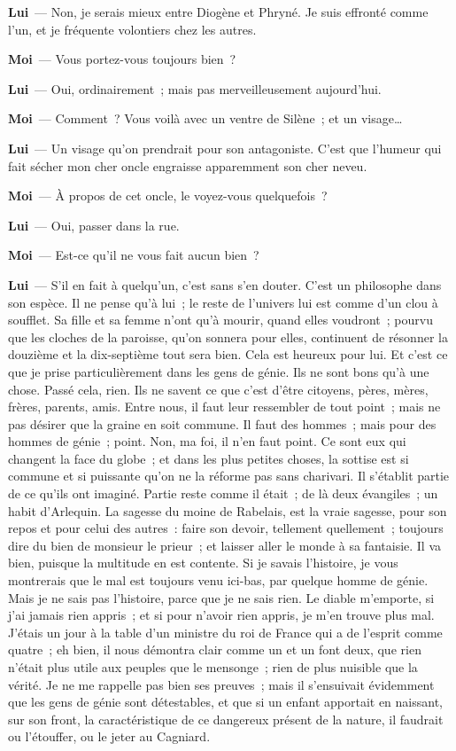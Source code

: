 \documentclass[french,twoside]{book} %
\newcommand{\labelchar}[1]{\textbf{\color{rubric} #1}}
\begin{document}
\labelchar{Lui} — Non, je serais mieux entre Diogène et Phryné. Je suis effronté comme l’un, et je fréquente volontiers chez les autres.\par
\labelchar{Moi} — Vous portez-vous toujours bien ?\par
\labelchar{Lui} — Oui, ordinairement ; mais pas merveilleusement aujourd’hui.\par
\labelchar{Moi} — Comment ? Vous voilà avec un ventre de Silène ; et un visage…\par
\labelchar{Lui} — Un visage qu’on prendrait pour son antagoniste. C’est que l’humeur qui fait sécher mon cher oncle engraisse apparemment son cher neveu.\par
\labelchar{Moi} — À propos de cet oncle, le voyez-vous quelquefois ?\par
\labelchar{Lui} — Oui, passer dans la rue.\par
\labelchar{Moi} — Est-ce qu’il ne vous fait aucun bien ?\par
\labelchar{Lui} — S’il en fait à quelqu’un, c’est sans s’en douter. C’est un philosophe dans son espèce. Il ne pense qu’à lui ; le reste de l’univers lui est comme d’un clou à soufflet. Sa fille et sa femme n’ont qu’à mourir, quand elles voudront ; pourvu que les cloches de la paroisse, qu’on sonnera pour elles, continuent de résonner la douzième et la dix-septième tout sera bien. Cela est heureux pour lui. Et c’est ce que je prise particulièrement dans les gens de génie. Ils ne sont bons qu’à une chose. Passé cela, rien. Ils ne savent ce que c’est d’être citoyens, pères, mères, frères, parents, amis. Entre nous, il faut leur ressembler de tout point ; mais ne pas désirer que la graine en soit commune. Il faut des hommes ; mais pour des hommes de génie ; point. Non, ma foi, il n’en faut point. Ce sont eux qui changent la face du globe ; et dans les plus petites choses, la sottise est si commune et si puissante qu’on ne la réforme pas sans charivari. Il s’établit partie de ce qu’ils ont imaginé. Partie reste comme il était ; de là deux évangiles ; un habit d’Arlequin. La sagesse du moine de Rabelais, est la vraie sagesse, pour son repos et pour celui des autres : faire son devoir, tellement quellement ; toujours dire du bien de monsieur le prieur ; et laisser aller le monde à sa fantaisie. Il va bien, puisque la multitude en est contente. Si je savais l’histoire, je vous montrerais que le mal est toujours venu ici-bas, par quelque homme de génie. Mais je ne sais pas l’histoire, parce que je ne sais rien. Le diable m’emporte, si j’ai jamais rien appris ; et si pour n’avoir rien appris, je m’en trouve plus mal. J’étais un jour à la table d’un ministre du roi de France qui a de l’esprit comme quatre ; eh bien, il nous démontra clair comme un et un font deux, que rien n’était plus utile aux peuples que le mensonge ; rien de plus nuisible que la vérité. Je ne me rappelle pas bien ses preuves ; mais il s’ensuivait évidemment que les gens de génie sont détestables, et que si un enfant apportait en naissant, sur son front, la caractéristique de ce dangereux présent de la nature, il faudrait ou l’étouffer, ou le jeter au Cagniard.\par
\end{document}
